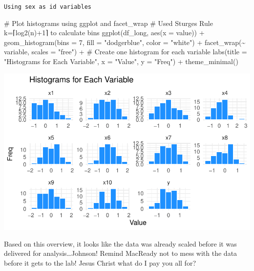 \documentclass[
  letterpaper,
  DIV=11,
  numbers=noendperiod]{scrartcl}
\newenvironment{Shaded}{\begin{snugshade}}{\end{snugshade}}
\newcommand{\AttributeTok}[1]{\textcolor[rgb]{0.40,0.45,0.13}{#1}}
\newcommand{\CommentTok}[1]{\textcolor[rgb]{0.37,0.37,0.37}{#1}}
\newcommand{\DecValTok}[1]{\textcolor[rgb]{0.68,0.00,0.00}{#1}}
\newcommand{\FunctionTok}[1]{\textcolor[rgb]{0.28,0.35,0.67}{#1}}
\newcommand{\NormalTok}[1]{\textcolor[rgb]{0.00,0.23,0.31}{#1}}
\newcommand{\SpecialCharTok}[1]{\textcolor[rgb]{0.37,0.37,0.37}{#1}}
\newcommand{\StringTok}[1]{\textcolor[rgb]{0.13,0.47,0.30}{#1}}
\begin{document}
\begin{verbatim}
Using sex as id variables
\end{verbatim}

\begin{Shaded}
\begin{Highlighting}[]
\CommentTok{\# Plot histograms using ggplot and facet\_wrap}
\CommentTok{\# Used Sturges\textquotesingle{} Rule k=⌈log2(n)+1⌉ to calculate bins}
\FunctionTok{ggplot}\NormalTok{(df\_long, }\FunctionTok{aes}\NormalTok{(}\AttributeTok{x =}\NormalTok{ value)) }\SpecialCharTok{+}
  \FunctionTok{geom\_histogram}\NormalTok{(}\AttributeTok{bins =} \DecValTok{7}\NormalTok{, }\AttributeTok{fill =} \StringTok{"dodgerblue"}\NormalTok{, }\AttributeTok{color =} \StringTok{"white"}\NormalTok{) }\SpecialCharTok{+}
  \FunctionTok{facet\_wrap}\NormalTok{(}\SpecialCharTok{\textasciitilde{}}\NormalTok{ variable, }\AttributeTok{scales =} \StringTok{"free"}\NormalTok{) }\SpecialCharTok{+}  \CommentTok{\# Create one histogram for each variable}
  \FunctionTok{labs}\NormalTok{(}\AttributeTok{title =} \StringTok{"Histograms for Each Variable"}\NormalTok{,}
       \AttributeTok{x =} \StringTok{"Value"}\NormalTok{, }
       \AttributeTok{y =} \StringTok{"Freq"}\NormalTok{) }\SpecialCharTok{+}
  \FunctionTok{theme\_minimal}\NormalTok{()}
\end{Highlighting}
\end{Shaded}

\includegraphics{Module-1-Script-v2_files/figure-pdf/unnamed-chunk-3-1.pdf}

Based on this overview, it looks like the data was already scaled before
it was delivered for analysis\ldots Johnson! Remind MacReady not to mess
with the data before it gets to the lab! Jesus Christ what do I pay you
all for?
\end{document}
